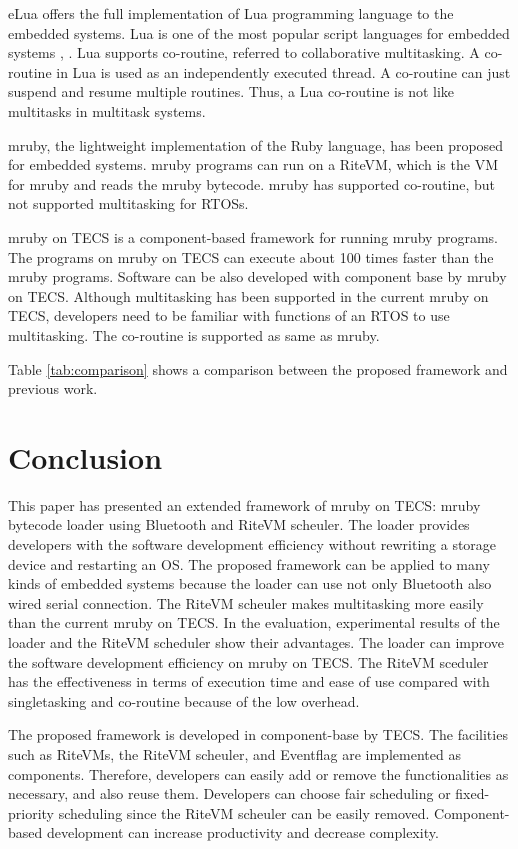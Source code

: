 \documentclass[conference,compsoc]{IEEEtran}
\begin{document}
eLua offers the full implementation of Lua programming language to the embedded systems.
Lua is one of the most popular script languages for embedded systems \cite{url:Lua}, \cite{par:Lua}.
Lua supports co-routine, referred to collaborative multitasking.
A co-routine in Lua is used as an independently executed thread.
A co-routine can just suspend and resume multiple routines.
Thus, a Lua co-routine is not like multitasks in multitask systems.

mruby, the lightweight implementation of the Ruby language, has been proposed for embedded systems.
mruby programs can run on a RiteVM, which is the VM for mruby and reads the mruby bytecode.
mruby has supported co-routine, but not supported multitasking for RTOSs.

mruby on TECS is a component-based framework for running mruby programs.
The programs on mruby on TECS can execute about 100 times faster than the mruby programs.
Software can be also developed with component base by mruby on TECS.
Although multitasking has been supported in the current mruby on TECS, developers need to be familiar with functions of an RTOS to use multitasking.
The co-routine is supported as same as mruby.

Table \ref{tab:comparison} shows a comparison between the proposed framework and previous work.

 
\section{Conclusion}
\label{sec:Conclusion}
This paper has presented an extended framework of mruby on TECS: mruby bytecode loader using Bluetooth and RiteVM scheuler.
The loader provides developers with the software development efficiency without rewriting a storage device and restarting an OS.
The proposed framework can be applied to many kinds of embedded systems  because the loader can use not only Bluetooth also wired serial connection.
The RiteVM scheuler makes multitasking more easily than the current mruby on TECS.
In the evaluation, experimental results of the loader and the RiteVM scheduler show their advantages.
The loader can improve the software development efficiency on mruby on TECS.
The RiteVM sceduler has the effectiveness in terms of execution time and ease of use compared with singletasking and co-routine because of the low overhead.

The proposed framework is developed in component-base by TECS.
The facilities such as RiteVMs, the RiteVM scheuler, and Eventflag are implemented as components.
Therefore, developers can easily add or remove the functionalities as necessary, and also reuse them.
Developers can choose fair scheduling or fixed-priority scheduling since the RiteVM scheuler can be easily removed.
Component-based development can increase productivity and decrease complexity.
\end{document}
